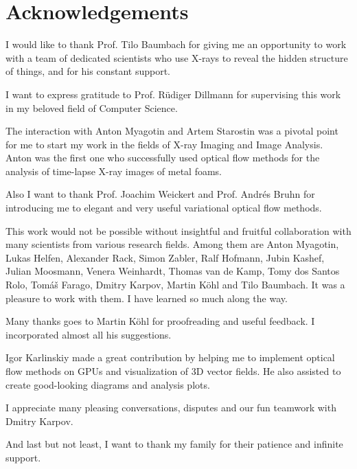 \chapter*{Acknowledgements}
\thispagestyle{empty}

\begingroup\onehalfspacing

I would like to thank Prof. Tilo Baumbach for giving me an opportunity to work with a team of dedicated scientists who use X-rays to reveal the hidden structure of things, and for his constant support. 

I want to express gratitude to Prof. R\"udiger Dillmann for supervising this work in my beloved field of Computer Science.

The interaction with Anton Myagotin and Artem Starostin was a pivotal point for me to start my work in the fields of X-ray Imaging and Image Analysis. Anton was the first one who successfully used optical flow methods for the analysis of time-lapse X-ray images of metal foams. 

Also I want to thank Prof. Joachim Weickert and Prof. Andr\'es Bruhn for introducing me to elegant and very useful variational optical flow methods.

This work would not be possible without insightful and fruitful collaboration with many scientists from various research fields. Among them are Anton Myagotin, Lukas Helfen, Alexander Rack, Simon Zabler, Ralf Hofmann, Jubin Kashef, Julian Moosmann, Venera Weinhardt, Thomas van de Kamp, Tomy dos Santos Rolo, Tom\'a\v{s} Farago, Dmitry Karpov, Martin K\"ohl and Tilo Baumbach.
It was a pleasure to work with them. I have learned so much along the way.

Many thanks goes to Martin K\"ohl for proofreading and useful feedback. I incorporated almost all his suggestions.

Igor Karlinskiy made a great contribution by helping me to implement optical flow methods on GPUs and visualization of 3D vector fields. He also assisted to create good-looking diagrams and analysis plots.

I appreciate many pleasing conversations, disputes and our fun teamwork with Dmitry Karpov.

And last but not least, I want to thank my family for their patience and infinite support. 

\endgroup


